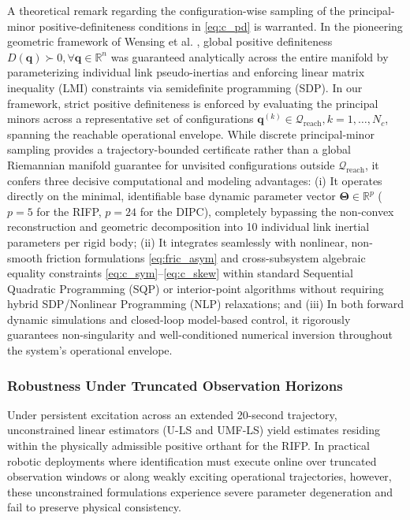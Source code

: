 \documentclass[lettersize,journal]{IEEEtran}
\begin{document}
A theoretical remark regarding the configuration-wise sampling of the principal-minor positive-definiteness conditions in \eqref{eq:c_pd} is warranted. In the pioneering geometric framework of Wensing et al. \cite{Wensing2018}, global positive definiteness $D(\bm{q}) \succ 0, \forall \bm{q} \in \mathbb{R}^n$ was guaranteed analytically across the entire manifold by parameterizing individual link pseudo-inertias and enforcing linear matrix inequality (LMI) constraints via semidefinite programming (SDP). In our framework, strict positive definiteness is enforced by evaluating the principal minors across a representative set of configurations $\bm{q}^{(k)} \in \mathcal{Q}_{\text{reach}}, k = 1, \dots, N_c$, spanning the reachable operational envelope. While discrete principal-minor sampling provides a trajectory-bounded certificate rather than a global Riemannian manifold guarantee for unvisited configurations outside $\mathcal{Q}_{\text{reach}}$, it confers three decisive computational and modeling advantages:
(i) It operates directly on the minimal, identifiable base dynamic parameter vector $\bm{\Theta} \in \mathbb{R}^p$ ($p = 5$ for the RIFP, $p = 24$ for the DIPC), completely bypassing the non-convex reconstruction and geometric decomposition into 10 individual link inertial parameters per rigid body;
(ii) It integrates seamlessly with nonlinear, non-smooth friction formulations \eqref{eq:fric_asym} and cross-subsystem algebraic equality constraints \eqref{eq:c_sym}--\eqref{eq:c_skew} within standard Sequential Quadratic Programming (SQP) or interior-point algorithms without requiring hybrid SDP/Nonlinear Programming (NLP) relaxations; and
(iii) In both forward dynamic simulations and closed-loop model-based control, it rigorously guarantees non-singularity and well-conditioned numerical inversion throughout the system's operational envelope.

\subsubsection{Robustness Under Truncated Observation Horizons}
Under persistent excitation across an extended 20-second trajectory, unconstrained linear estimators (U-LS and UMF-LS) yield estimates residing within the physically admissible positive orthant for the RIFP. In practical robotic deployments where identification must execute online over truncated observation windows or along weakly exciting operational trajectories, however, these unconstrained formulations experience severe parameter degeneration and fail to preserve physical consistency.  
\end{document}
